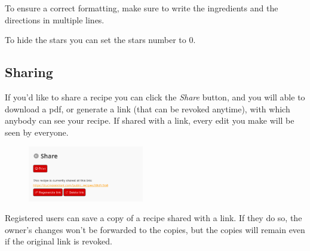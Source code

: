 \documentclass[12pt, a4paper]{article}
\begin{document}
    To ensure a correct formatting, make sure to write the ingredients and the
    directions in multiple lines.

    To hide the stars you can set the stars number to 0.

	\subsection{Sharing}

	If you'd like to share a recipe you can click the \emph{Share} button, and
    you will able to download a pdf, or generate a link (that can be revoked
    anytime), with which anybody can see your recipe. If shared with a link,
    every edit you make will be seen by everyone.

    \begin{figure}[H]
        \centering
        \includegraphics[width=0.45\textwidth]{assets/en/recipe_sharing.png}
    \end{figure}

	Registered users can save a copy of a recipe shared with a link. If they do
    so, the owner's changes won't be forwarded to the copies, but the
	copies will remain even if the original link is revoked.
\end{document}
